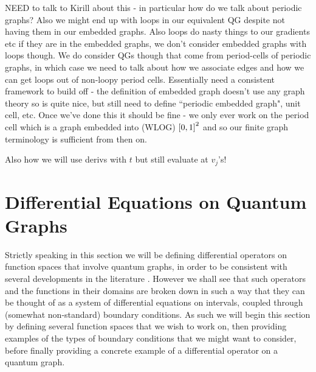 NEED to talk to Kirill about this - in particular how do we talk about periodic graphs? Also we might end up with loops in our equivalent QG despite not having them in our embedded graphs.
Also loops do nasty things to our gradients etc if they are in the embedded graphs, we don't consider embedded graphs with loops though.
We do consider QGs though that come from period-cells of periodic graphs, in which case we need to talk about how we associate edges and how we can get loops out of non-loopy period cells.
Essentially need a consistent framework to build off - the definition of embedded graph doesn't use any graph theory so is quite nice, but still need to define ``periodic embedded graph", unit cell, etc.
Once we've done this it should be fine - we only ever work on the period cell which is a graph embedded into (WLOG) $\left[ 0,1 \right]^2$ and so our finite graph terminology is sufficient from then on.

Also how we will use derivs with $t$ but still evaluate at $v_j$'s!

\section{Differential Equations on Quantum Graphs} \label{sec:DEonQG}
Strictly speaking in this section we will be defining differential operators on function spaces that involve quantum graphs, in order to be consistent with several developments in the literature .
However we shall see that such operators and the functions in their domains are broken down in such a way that they can be thought of as a system of differential equations on intervals, coupled through (somewhat non-standard) boundary conditions.
As such we will begin this section by defining several function spaces that we wish to work on, then providing examples of the types of boundary conditions that we might want to consider, before finally providing a concrete example of a differential operator on a quantum graph. \newline


